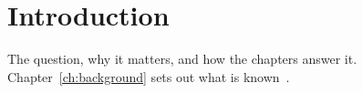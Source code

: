 \chapter{Introduction}
\label{ch:introduction}

The question, why it matters, and how the chapters answer it. Chapter~\ref{ch:background} sets out what is known~\cite{knuth1984}.
